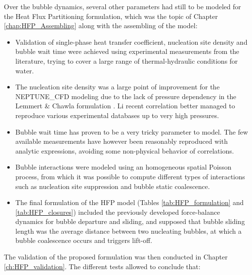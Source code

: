 Over the bubble dynamics, several other parameters had still to be modeled for the Heat Flux Partitioning formulation, which was the topic of Chapter \ref{chap:HFP_Assembling} along with the assembling of the model:

\begin{itemize}
\item Validation of single-phase heat transfer coefficient, nucleation site density and bubble wait time were achieved using experimental measurements from the literature, trying to cover a large range of thermal-hydraulic conditions for water.

\item The nucleation site density was a large point of improvement for the NEPTUNE\_CFD modeling due to the lack of pressure dependency in the Lemmert \& Chawla formulation \cite{lemmert_influence_1977}. Li \etal \cite{li_development_2018} recent correlation better managed to reproduce various experimental databases up to very high pressures.

\item Bubble wait time has proven to be a very tricky parameter to model. The few available measurements have however been reasonably reproduced with analytic expressions, avoiding some non-physical behavior of correlations.

\item Bubble interactions were modeled using an homogeneous spatial Poisson process, from which it was possible to compute different types of interactions such as nucleation site suppression and bubble static coalescence. 

\item The final formulation of the HFP model (Tables \ref{tab:HFP_formulation} and \ref{tab:HFP_closures}) included the previously developed force-balance dynamics for bubble departure and sliding, and supposed that bubble sliding length was the average distance between two nucleating bubbles, at which a bubble coalescence occurs and triggers lift-off.
\end{itemize}

The validation of the proposed formulation was then conducted in Chapter \ref{ch:HFP_validation}. The different tests allowed to conclude that:

